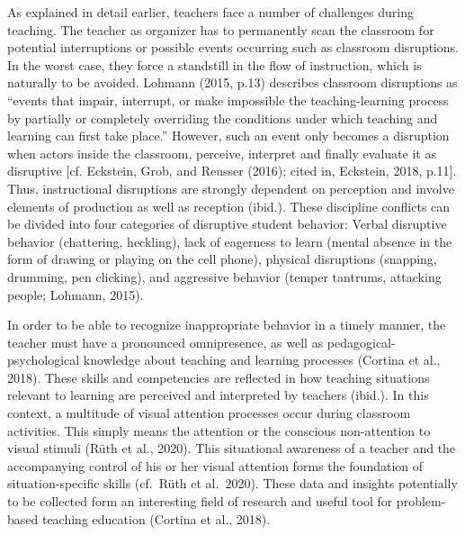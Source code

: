 \documentclass[
  man]{apa6}
\begin{document}
As explained in detail earlier, teachers face a number of challenges during teaching. The teacher as organizer has to permanently scan the classroom for potential interruptions or possible events occurring such as classroom disruptions. In the worst case, they force a standstill in the flow of instruction, which is naturally to be avoided. Lohmann (2015, p.13) describes classroom disruptions as ``events that impair, interrupt, or make impossible the teaching-learning process by partially or completely overriding the conditions under which teaching and learning can first take place.'' However, such an event only becomes a disruption when actors inside the classroom, perceive, interpret and finally evaluate it as disruptive {[}cf. Eckstein, Grob, and Reusser (2016); cited in, Eckstein, 2018, p.11{]}. Thus, instructional disruptions are strongly dependent on perception and involve elements of production as well as reception (ibid.). These discipline conflicts can be divided into four categories of disruptive student behavior: Verbal disruptive behavior (chattering, heckling), lack of eagerness to learn (mental absence in the form of drawing or playing on the cell phone), physical disruptions (snapping, drumming, pen clicking), and aggressive behavior (temper tantrums, attacking people; Lohmann, 2015).

In order to be able to recognize inappropriate behavior in a timely manner, the teacher must have a pronounced omnipresence, as well as pedagogical-psychological knowledge about teaching and learning processes (Cortina et al., 2018). These skills and competencies are reflected in how teaching situations relevant to learning are perceived and interpreted by teachers (ibid.). In this context, a multitude of visual attention processes occur during classroom activities. This simply means the attention or the conscious non-attention to visual stimuli (Rüth et al., 2020). This situational awareness of a teacher and the accompanying control of his or her visual attention forms the foundation of situation-specific skills (cf.~Rüth et al.~2020). These data and insights potentially to be collected form an interesting field of research and useful tool for problem-based teaching education (Cortina et al., 2018).
\end{document}
